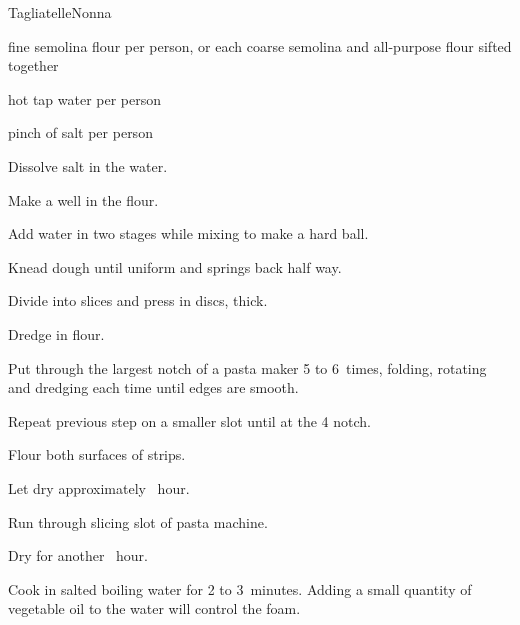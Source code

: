 \begin{recipe}{Tagliatelle}{Nonna}{}

\begin{ingredients}
\item {} fine semolina flour per person, or  each coarse semolina and all-purpose flour sifted together
\item {} hot tap water per person
\item pinch of salt per person
\end{ingredients}

\begin{directions}
\item Dissolve salt in the water.
\item Make a well in the flour.
\item Add water in two stages while mixing to make a hard ball.
\item Knead dough until uniform and springs back half way.
\item Divide into slices and press in  discs, \inch{\threequarter} thick.
\item Dredge in flour.
\item Put through the largest notch of a pasta maker 5 to 6~times, folding, rotating and dredging each time until edges are smooth.
\item Repeat previous step on a smaller slot until at the 4 notch.
\item Flour both surfaces of strips.
\item Let dry approximately \half~hour.
\item Run through slicing slot of pasta machine.
\item Dry for another \half~hour.
\item Cook in salted boiling water for 2 to 3~minutes. Adding a small quantity of vegetable oil to the water will control the foam.
\end{directions}

\end{recipe}
